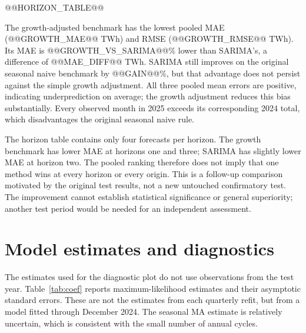 \documentclass[11pt,a4paper,twoside,reqno]{amsart}
\numberwithin{equation}{section}
\begin{document}
@@HORIZON_TABLE@@

The growth-adjusted benchmark has the lowest pooled MAE (@@GROWTH_MAE@@ TWh) and RMSE (@@GROWTH_RMSE@@ TWh). Its MAE is @@GROWTH_VS_SARIMA@@\% lower than SARIMA's, a difference of @@MAE_DIFF@@ TWh. SARIMA still improves on the original seasonal naive benchmark by @@GAIN@@\%, but that advantage does not persist against the simple growth adjustment. All three pooled mean errors are positive, indicating underprediction on average; the growth adjustment reduces this bias substantially. Every observed month in 2025 exceeds its corresponding 2024 total, which disadvantages the original seasonal naive rule.

The horizon table contains only four forecasts per horizon. The growth benchmark has lower MAE at horizons one and three; SARIMA has slightly lower MAE at horizon two. The pooled ranking therefore does not imply that one method wins at every horizon or every origin. This is a follow-up comparison motivated by the original test results, not a new untouched confirmatory test. The improvement cannot establish statistical significance or general superiority; another test period would be needed for an independent assessment.

\section{Model estimates and diagnostics}

The estimates used for the diagnostic plot do not use observations from the test year. Table~\ref{tab:coef} reports maximum-likelihood estimates and their asymptotic standard errors. These are not the estimates from each quarterly refit, but from a model fitted through December 2024. The seasonal MA estimate is relatively uncertain, which is consistent with the small number of annual cycles.\par
\end{document}

